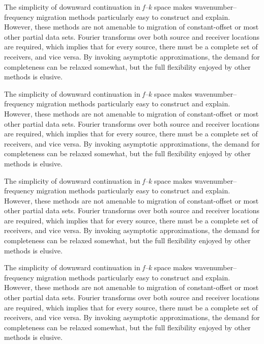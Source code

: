 The simplicity of downward continuation in \textit{f--k} space makes wavenumber--frequency migration methods particularly easy to construct and explain.
However, these methods are not amenable to migration of constant-offset or most other partial data sets. Fourier transforms over both source
and receiver locations are required, which implies that for every source, there must be a complete set of receivers, and vice versa. By invoking
asymptotic approximations, the demand for completeness can be relaxed somewhat, but the full flexibility enjoyed by other methods is elusive.

\begin{theorem}
The simplicity of downward continuation in \textit{f--k} space makes wavenumber--frequency migration methods particularly easy to construct and explain.
However, these methods are not amenable to migration of constant-offset or most other partial data sets. Fourier transforms over both source
and receiver locations are required, which implies that for every source, there must be a complete set of receivers, and vice versa. By invoking
asymptotic approximations, the demand for completeness can be relaxed somewhat, but the full flexibility enjoyed by other methods is elusive.
\end{theorem}

The simplicity of downward continuation in \textit{f--k} space makes wavenumber--frequency migration methods particularly easy to construct and explain.
However, these methods are not amenable to migration of constant-offset or most other partial data sets. Fourier transforms over both source
and receiver locations are required, which implies that for every source, there must be a complete set of receivers, and vice versa. By invoking
asymptotic approximations, the demand for completeness can be relaxed somewhat, but the full flexibility enjoyed by other methods is elusive.

\begin{definition}
The simplicity of downward continuation in \textit{f--k} space makes wavenumber--frequency migration methods particularly easy to construct and explain.
However, these methods are not amenable to migration of constant-offset or most other partial data sets. Fourier transforms over both source
and receiver locations are required, which implies that for every source, there must be a complete set of receivers, and vice versa. By invoking
asymptotic approximations, the demand for completeness can be relaxed somewhat, but the full flexibility enjoyed by other methods is elusive.
\end{definition}

